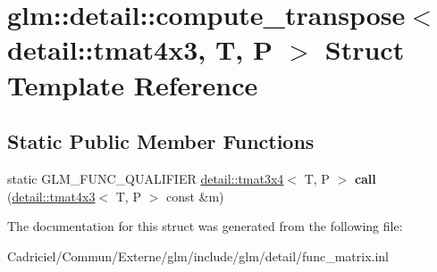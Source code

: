 \hypertarget{structglm_1_1detail_1_1compute__transpose_3_01detail_1_1tmat4x3_00_01_t_00_01_p_01_4}{}\section{glm\+:\+:detail\+:\+:compute\+\_\+transpose$<$ detail\+:\+:tmat4x3, T, P $>$ Struct Template Reference}
\label{structglm_1_1detail_1_1compute__transpose_3_01detail_1_1tmat4x3_00_01_t_00_01_p_01_4}
\subsection*{Static Public Member Functions}
\begin{DoxyCompactItemize}
\item 
static G\+L\+M\+\_\+\+F\+U\+N\+C\+\_\+\+Q\+U\+A\+L\+I\+F\+I\+ER \hyperlink{structglm_1_1detail_1_1tmat3x4}{detail\+::tmat3x4}$<$ T, P $>$ {\bfseries call} (\hyperlink{structglm_1_1detail_1_1tmat4x3}{detail\+::tmat4x3}$<$ T, P $>$ const \&m)\hypertarget{structglm_1_1detail_1_1compute__transpose_3_01detail_1_1tmat4x3_00_01_t_00_01_p_01_4_aba1245556b2c86727dfb37d64f6a9b9a}{}\label{structglm_1_1detail_1_1compute__transpose_3_01detail_1_1tmat4x3_00_01_t_00_01_p_01_4_aba1245556b2c86727dfb37d64f6a9b9a}

\end{DoxyCompactItemize}


The documentation for this struct was generated from the following file\+:\begin{DoxyCompactItemize}
\item 
Cadriciel/\+Commun/\+Externe/glm/include/glm/detail/func\+\_\+matrix.\+inl\end{DoxyCompactItemize}
